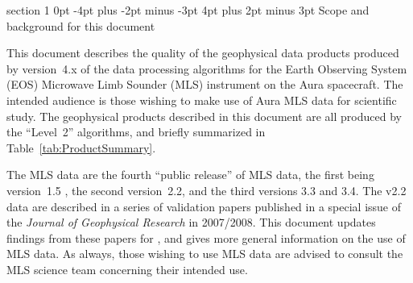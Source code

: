 \documentclass[11pt,draft]{report}
\makeatletter
\renewcommand{\section}{\@startsection%
  {section}%
  {1}%
  {0pt}%
  {-4pt plus -2pt minus -3pt}%
  {4pt plus 2pt minus 3pt}%
  {\Large\sffamily\fontseries{sb}\selectfont\flushleft\color{SectionColor}\figureversion{tabular}}}%
\makeatother
\begin{document}
\section{Scope and background for this document}

This document describes the quality of the geophysical data products
produced by version~4.x of the data processing algorithms for the Earth
Observing System (EOS) Microwave Limb Sounder (MLS) instrument on the
Aura spacecraft.  The intended audience is those wishing to make use of
Aura MLS data for scientific study.  The geophysical products described
in this document are all produced by the ``Level~2'' algorithms, and
briefly summarized in Table~\ref{tab:ProductSummary}.

The \thisv MLS data are the fourth ``public release'' of MLS data, the
first being version~1.5 \citep{EOSMLSV15Quality}, the second
version~2.2, and the third versions 3.3 and 3.4.  The v2.2 data are
described in a series of validation papers published in a special issue
of the \emph{Journal of Geophysical Research} in 2007/2008.  This
document updates findings from these papers for \thisv, and gives more
general information on the use of MLS data.  As always, those wishing to
use MLS data are advised to consult the MLS science team concerning
their intended use.
\end{document}
